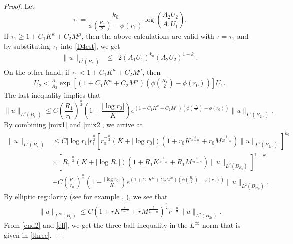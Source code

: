 \documentclass[11pt]{amsart}
\theoremstyle{plain}
\numberwithin{equation}{section}
\begin{document}
\begin{proof}
Let
$$\tau_1 =\frac{k_0}{\phi{\left( {\frac{R_1}{2}} \right) }-\phi(r_1)}\log{\left( {\frac{A_2{U}_2}{A_1 {U}_1}} \right) }.$$
If $\tau_1 \ge 1 + C_1 K^\kappa + C_2 M^\mu$, then the above calculations are valid with $\tau = \tau_1$ and by substituting $\tau_1$ into \eqref{D4est}, we get
\begin{eqnarray}
\| u\|_{L^2 (B_{r_1})}  &\leq& 2{\left( {A_1 U_1} \right) }^{k_0}{\left( {A_2 U_2} \right) }^{1 - k_0}.
\label{mix1}
\end{eqnarray}
On the other hand, if $\tau_1 < 1 + C_1 K^\kappa + C_2 M^\mu$, then
\begin{align*}
U_2
< \frac{A_1}{A_2} \exp{\left[{{\left( {1 + C_1 K^\kappa + C_2 M^\mu} \right) } {\left( {\phi{\left( {\frac{R_1}{2}} \right) }-\phi(r_0)} \right) }}\right]} U_1.
\end{align*}
The last inequality implies that
\begin{equation}
\|u\|_{L^2 (B_{r_1})}
\le C {\left( {\frac{R_1}{r_0}} \right) }^{\frac n 2} {\left( {1 +\frac{|\log r_0|}{K}} \right) } e^{{\left( {1 + C_1 K^\kappa + C_2 M^\mu} \right) } {\left( {\phi{\left( {\frac{R_1}{2}} \right) }-\phi(r_0)} \right) }} \|u\|_{L^2(B_{2r_0})}.
\label{mix2}
\end{equation}
By combining \eqref{mix1} and \eqref{mix2}, we arrive at
\begin{align}
\| u\|_{L^2 (B_{r_1})}
&\le C  |\log r_1| r_1^{\frac n 2}{\left[{ r_0^{-\frac{n}{2}}{\left( {K+|\log r_0|} \right) } {\left( {1+ r_0K^{\frac{s}{s-n}}+r_0M^{\frac{t}{2t-n}}} \right) } \|u\|_{L^2(B_{2r_0})}}\right]}^{k_0} \nonumber \\
&\times {\left[{R_1^{-\frac{n}{2}}{\left( {K+|\log R_1|} \right) } {\left( {1+R_1K^{\frac{s}{s-n}}+R_1M^{\frac{t}{2t-n}}} \right) } \|u\|_{L^2(B_{R_1})}}\right]}^{1 - k_0} \nonumber \\
&+C {\left( {\frac{R_1}{r_0}} \right) }^{\frac n 2} {\left( {1 +\frac{|\log r_0|}{K}} \right) }
e^{{\left( {1 + C_1 K^\kappa + C_2 M^\mu} \right) }
{\left( {\phi{\left( {\frac{R_1}{2}} \right) }-\phi(r_0)} \right) }} \|u\|_{L^2(B_{2r_0})}.
 \label{end2}
\end{align}
By elliptic regularity (see for example \cite{HL11}, \cite{GT01}), we see that
\begin{align}
\|u\|_{L^\infty(B_r)}
\le C{\left( {1 + r K^{\frac{s}{s-n}} + r M^{\frac{t}{2t-n}}} \right) }^{\frac n 2}r^{- \frac n 2}\|u\|_{L^2(B_{2r})}.
\label{ell}
\end{align}
From \eqref{end2} and \eqref{ell}, we get the three-ball inequality in the $L^\infty$-norm that is given in \eqref{three}.
\end{proof}
\end{document}
